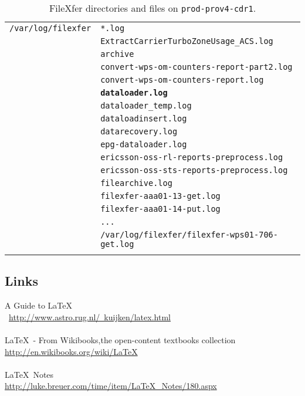 \documentclass[12pt,letterpaper,dvips]{article}
\begin{document}
\begin{longtable}[l]{ll}
    \texttt{/var/log/filexfer}&\texttt{*.log}\\
    &\texttt{ExtractCarrierTurboZoneUsage\_ACS.log}\\
    &\texttt{archive}\\
    &\texttt{convert-wps-om-counters-report-part2.log}\\
    &\texttt{convert-wps-om-counters-report.log}\\
    &\texttt{\textbf{dataloader.log}}\\
    &\texttt{dataloader\_temp.log}\\
    &\texttt{dataloadinsert.log}\\
    &\texttt{datarecovery.log}\\
    &\texttt{epg-dataloader.log}\\
    &\texttt{ericsson-oss-rl-reports-preprocess.log}\\
    &\texttt{ericsson-oss-sts-reports-preprocess.log}\\
    &\texttt{filearchive.log}\\
    &\texttt{filexfer-aaa01-13-get.log}\\
    &\texttt{filexfer-aaa01-14-put.log}\\
    &\texttt{...}\\
    &\texttt{/var/log/filexfer/filexfer-wps01-706-get.log}\\
    \hline \hline
    \caption{FileXfer directories and files on \texttt{prod-prov4-cdr1}.}
    \label{longtable}
\end{longtable}


\subsection{Links}
A Guide to \LaTeX\\\
\href{http://www.astro.rug.nl/~kuijken/latex.html}
{http://www.astro.rug.nl/~kuijken/latex.html}
\\
\\
\LaTeX\ - From Wikibooks,the open-content textbooks collection\\
\href{http://en.wikibooks.org/wiki/LaTeX}{http://en.wikibooks.org/wiki/LaTeX}
\\
\\
\LaTeX\ Notes\\
\href{http://luke.breuer.com/time/item/LaTeX\_Notes/180.aspx}{http://luke.breuer.com/time/item/LaTeX\_Notes/180.aspx}
\end{document}
